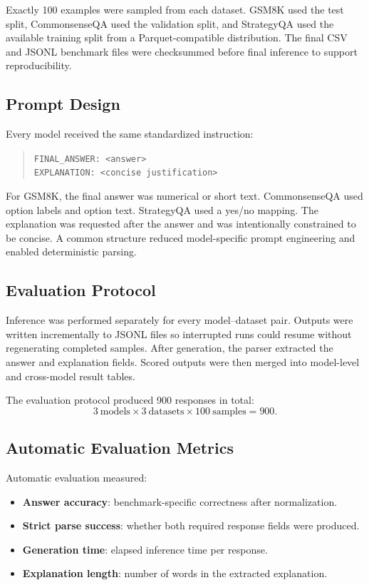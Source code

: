 \documentclass{article}
\begin{document}
Exactly 100 examples were sampled from each dataset. GSM8K used the test split, CommonsenseQA used the validation split, and StrategyQA used the available training split from a Parquet-compatible distribution. The final CSV and JSONL benchmark files were checksummed before final inference to support reproducibility.

\subsection{Prompt Design}

Every model received the same standardized instruction:

\begin{quote}
\texttt{FINAL\_ANSWER: <answer>}\\
\texttt{EXPLANATION: <concise justification>}
\end{quote}

For GSM8K, the final answer was numerical or short text. CommonsenseQA used option labels and option text. StrategyQA used a yes/no mapping. The explanation was requested after the answer and was intentionally constrained to be concise. A common structure reduced model-specific prompt engineering and enabled deterministic parsing.

\subsection{Evaluation Protocol}

Inference was performed separately for every model--dataset pair. Outputs were written incrementally to JSONL files so interrupted runs could resume without regenerating completed samples. After generation, the parser extracted the answer and explanation fields. Scored outputs were then merged into model-level and cross-model result tables.

The evaluation protocol produced 900 responses in total:
\[
3\ \text{models} \times 3\ \text{datasets} \times 100\ \text{samples}=900.
\]

\subsection{Automatic Evaluation Metrics}

Automatic evaluation measured:

\begin{itemize}
    \item \textbf{Answer accuracy}: benchmark-specific correctness after normalization.
    \item \textbf{Strict parse success}: whether both required response fields were produced.
    \item \textbf{Generation time}: elapsed inference time per response.
    \item \textbf{Explanation length}: number of words in the extracted explanation.
\end{itemize}
\end{document}
